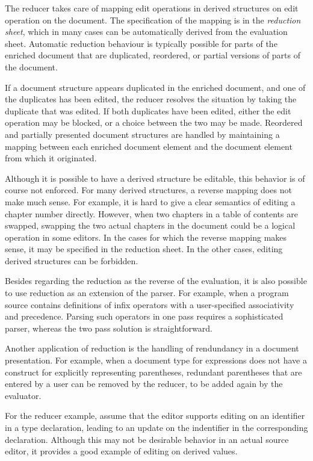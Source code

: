 The reducer takes care of mapping edit operations in derived structures on edit operation on the document. The specification of the mapping is in the {\em reduction sheet}, which in many cases can be automatically derived from the evaluation sheet. Automatic reduction behaviour is typically possible for parts of the enriched document that are duplicated, reordered, or partial versions of parts of the document. 

If a document structure appears duplicated in the enriched document, and one of the duplicates has been edited, the reducer resolves the situation by taking the duplicate that was edited. If both duplicates have been edited, either the edit operation may be blocked, or a choice between the two may be made. Reordered and partially presented document structures are handled by maintaining a mapping between each enriched document element and the document element from which it originated.

Although it is possible to have a derived structure be editable, this behavior is of course not enforced. For many derived structures, a reverse mapping does not make much sense. For example, it is hard to give a clear semantics of editing a chapter number directly. However, when two chapters in a table of contents are swapped, swapping the two actual chapters in the document could be a logical operation in some editors. In the cases for which the reverse mapping makes sense, it may be specified in the reduction sheet. In the other cases, editing derived structures can be forbidden.

Besides regarding the reduction as the reverse of the evaluation, it is also possible to use reduction as an extension of the parser. For example, when a program source contains definitions of infix operators with a user-specified associativity and precedence. Parsing such operators in one pass requires a sophisticated parser, whereas the two pass solution is straightforward.

Another application of reduction is the handling of rendundancy in a document presentation. For example, when a document type for expressions does not have a construct for explicitly representing parentheses, redundant parentheses that are entered by a user can be removed by the reducer, to be added again by the evaluator.


For the reducer example, assume that the editor supports editing on an identifier in a type declaration, leading to an update on the indentifier in the corresponding declaration. Although this may not be desirable behavior in an actual source editor, it provides a good example of editing on derived values.

